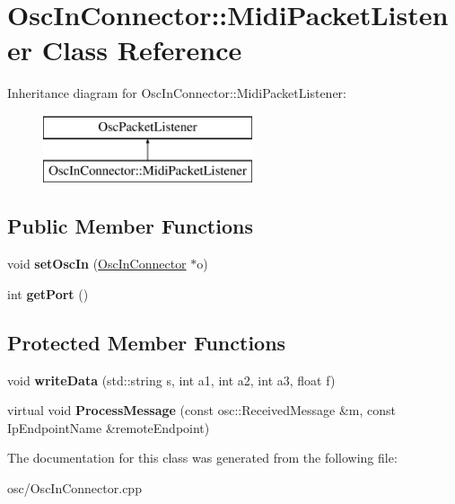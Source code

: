 \hypertarget{classOscInConnector_1_1MidiPacketListener}{}\section{Osc\+In\+Connector\+:\+:Midi\+Packet\+Listener Class Reference}
\label{classOscInConnector_1_1MidiPacketListener}
Inheritance diagram for Osc\+In\+Connector\+:\+:Midi\+Packet\+Listener\+:\begin{figure}[H]
\begin{center}
\leavevmode
\includegraphics[height=2.000000cm]{classOscInConnector_1_1MidiPacketListener}
\end{center}
\end{figure}
\subsection*{Public Member Functions}
\begin{DoxyCompactItemize}
\item 
void {\bfseries set\+Osc\+In} (\hyperlink{classOscInConnector}{Osc\+In\+Connector} $\ast$o)\hypertarget{classOscInConnector_1_1MidiPacketListener_ab4e0346cad409b3871add20bc5c8c904}{}\label{classOscInConnector_1_1MidiPacketListener_ab4e0346cad409b3871add20bc5c8c904}

\item 
int {\bfseries get\+Port} ()\hypertarget{classOscInConnector_1_1MidiPacketListener_affd65358cd1ffcde113576b8023fa8d6}{}\label{classOscInConnector_1_1MidiPacketListener_affd65358cd1ffcde113576b8023fa8d6}

\end{DoxyCompactItemize}
\subsection*{Protected Member Functions}
\begin{DoxyCompactItemize}
\item 
void {\bfseries write\+Data} (std\+::string s, int a1, int a2, int a3, float f)\hypertarget{classOscInConnector_1_1MidiPacketListener_a6ad19bb71d7d360d432eecd4d2f8aa0f}{}\label{classOscInConnector_1_1MidiPacketListener_a6ad19bb71d7d360d432eecd4d2f8aa0f}

\item 
virtual void {\bfseries Process\+Message} (const osc\+::\+Received\+Message \&m, const Ip\+Endpoint\+Name \&remote\+Endpoint)\hypertarget{classOscInConnector_1_1MidiPacketListener_ad5b4e469c87859e8577d2bf77aaa66bd}{}\label{classOscInConnector_1_1MidiPacketListener_ad5b4e469c87859e8577d2bf77aaa66bd}

\end{DoxyCompactItemize}


The documentation for this class was generated from the following file\+:\begin{DoxyCompactItemize}
\item 
osc/Osc\+In\+Connector.\+cpp\end{DoxyCompactItemize}
